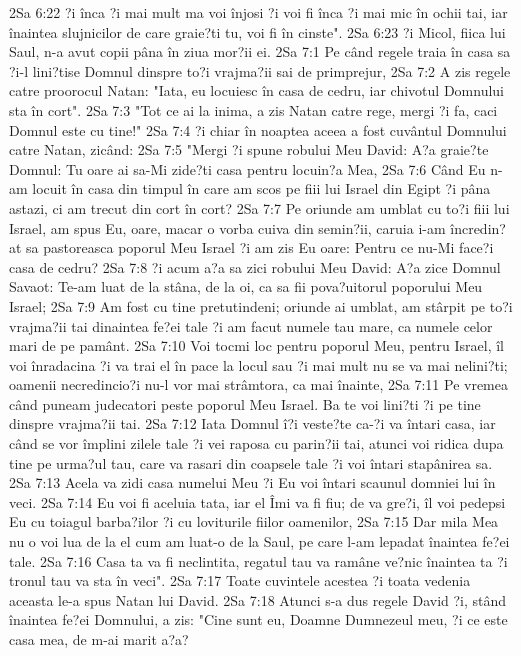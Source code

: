 2Sa 6:22  ?i înca ?i mai mult ma voi înjosi ?i voi fi înca ?i mai mic în ochii tai, iar înaintea slujnicilor de care graie?ti tu, voi fi în cinste".
2Sa 6:23  ?i Micol, fiica lui Saul, n-a avut copii pâna în ziua mor?ii ei.
2Sa 7:1  Pe când regele traia în casa sa ?i-l lini?tise Domnul dinspre to?i vrajma?ii sai de primprejur,
2Sa 7:2  A zis regele catre proorocul Natan: "Iata, eu locuiesc în casa de cedru, iar chivotul Domnului sta în cort".
2Sa 7:3  "Tot ce ai la inima, a zis Natan catre rege, mergi ?i fa, caci Domnul este cu tine!"
2Sa 7:4  ?i chiar în noaptea aceea a fost cuvântul Domnului catre Natan, zicând:
2Sa 7:5  "Mergi ?i spune robului Meu David: A?a graie?te Domnul: Tu oare ai sa-Mi zide?ti casa pentru locuin?a Mea,
2Sa 7:6  Când Eu n-am locuit în casa din timpul în care am scos pe fiii lui Israel din Egipt ?i pâna astazi, ci am trecut din cort în cort?
2Sa 7:7  Pe oriunde am umblat cu to?i fiii lui Israel, am spus Eu, oare, macar o vorba cuiva din semin?ii, caruia i-am încredin?at sa pastoreasca poporul Meu Israel ?i am zis Eu oare: Pentru ce nu-Mi face?i casa de cedru?
2Sa 7:8  ?i acum a?a sa zici robului Meu David: A?a zice Domnul Savaot: Te-am luat de la stâna, de la oi, ca sa fii pova?uitorul poporului Meu Israel;
2Sa 7:9  Am fost cu tine pretutindeni; oriunde ai umblat, am stârpit pe to?i vrajma?ii tai dinaintea fe?ei tale ?i am facut numele tau mare, ca numele celor mari de pe pamânt.
2Sa 7:10  Voi tocmi loc pentru poporul Meu, pentru Israel, îl voi înradacina ?i va trai el în pace la locul sau ?i mai mult nu se va mai nelini?ti; oamenii necredincio?i nu-l vor mai strâmtora, ca mai înainte,
2Sa 7:11  Pe vremea când puneam judecatori peste poporul Meu Israel. Ba te voi lini?ti ?i pe tine dinspre vrajma?ii tai.
2Sa 7:12  Iata Domnul î?i veste?te ca-?i va întari casa, iar când se vor împlini zilele tale ?i vei raposa cu parin?ii tai, atunci voi ridica dupa tine pe urma?ul tau, care va rasari din coapsele tale ?i voi întari stapânirea sa.
2Sa 7:13  Acela va zidi casa numelui Meu ?i Eu voi întari scaunul domniei lui în veci.
2Sa 7:14  Eu voi fi aceluia tata, iar el Îmi va fi fiu; de va gre?i, îl voi pedepsi Eu cu toiagul barba?ilor ?i cu loviturile fiilor oamenilor,
2Sa 7:15  Dar mila Mea nu o voi lua de la el cum am luat-o de la Saul, pe care l-am lepadat înaintea fe?ei tale.
2Sa 7:16  Casa ta va fi neclintita, regatul tau va ramâne ve?nic înaintea ta ?i tronul tau va sta în veci".
2Sa 7:17  Toate cuvintele acestea ?i toata vedenia aceasta le-a spus Natan lui David.
2Sa 7:18  Atunci s-a dus regele David ?i, stând înaintea fe?ei Domnului, a zis: "Cine sunt eu, Doamne Dumnezeul meu, ?i ce este casa mea, de m-ai marit a?a?
